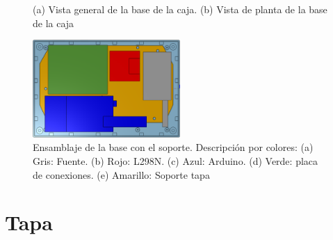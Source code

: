 \newpage

\begin{figure}[htpb]%
    \centering 
    \hspace{10pt}%
    \caption{(a) Vista general de la base de la caja. (b) Vista de planta de la base de la caja}
    \label{fig:cajabase} 
\end{figure} 


\begin{figure}[hbtp]
    \centering
    \includegraphics[width=0.5\textwidth]{04-caja/ensamblajebase.png}
    \caption{Ensamblaje de la base con el soporte. Descripción por colores: (a) Gris: Fuente. (b) Rojo: L298N. (c) Azul: Arduino. (d) Verde: placa de conexiones. (e) Amarillo: Soporte tapa}
    \label{fig:ensamblajebase}
    \end{figure}

\section{Tapa}

